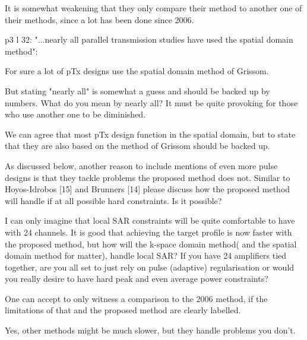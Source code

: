 \documentclass[11pt]{article}
\begin{document}
 It is somewhat weakening that they only compare their method to another one of their methods, since a lot has been done since 2006.

p3 l 32: "...nearly all parallel transmission studies have used the spatial domain method":

For sure a lot of pTx designs use the spatial domain method of Grissom.

But stating "nearly all" is somewhat a guess and should be backed up by numbers. What do you mean by nearly all? It must be quite provoking for those who use another one to be diminished.

We can agree that most pTx design function in the spatial domain, but to state that they are also based on the method of Grissom should be backed up.

As discussed below, another reason to include mentions of even more pulse designs is that they tackle problems the proposed method does not. Similar to Hoyos-Idrobos [15] and Brunners [14] please discuss how the proposed method will handle if at all possible hard constraints. Is it possible?

I can only imagine that local SAR constraints will be quite comfortable to have with 24 channels. It is good that achieving the target profile is now faster with the proposed method, but how will the k-space domain method( and the spatial domain method for matter), handle local SAR? If you have 24 amplifiers tied together, are you all set to just rely on pulse (adaptive) regularisation or would you really desire to have hard peak and even average power constraints?

One can accept to only witness a comparison to the 2006 method, if the limitations of that and the proposed method are clearly labelled.

Yes, other methods might be much slower, but they handle problems you don't.
\\[0.2em]
\indent{\it \textcolor{blue}{We agree that we needed to tone down the language here. We have revised wording to indicate that most
parallel transmission studies have been formulated in the spatial domain, rather than being explicitly derived directly from the spatial domain method.
We have also added in the Discussion that it is not clear at this time whether or how hard power or SAR constraints could be directly built in to the method,
though the method would be compatible with parallel transmit VERSE methods.}}
\\[1.2em]
\end{document}
